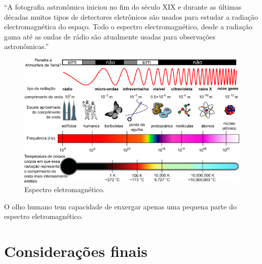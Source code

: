 \documentclass[
	article,			%
	12pt,				%
	oneside,			%
	a4paper,			%
	english,			%
	brazil,				%
	sumario=tradicional
	]{abntex2}
\begin{document}
``A fotografia astronômica iniciou no fim do século XIX e durante as últimas 
décadas muitos tipos de detectores eletrônicos são usados para estudar a
radiação electromagnética do espaço. Todo o espectro electromagnético, desde a 
radiação gama até as ondas de rádio são atualmente usadas para observações 
astronômicas.'' \cite{fotometria}

\begin{figure}[h]
	\includegraphics[width=\linewidth]{img/espectro.png}
	\caption{Espectro eletromagnético.}
	\label{fig:esel}
	\centering
\end{figure}

O olho humano tem capacidade de enxergar apenas uma pequena parte do espectro
eletromagnético.

% 

\section{Considerações finais}

\lipsum[1]

\begin{citacao}
\lipsum[2]
\end{citacao}

\lipsum[3]
\newpage
\postextual{}


\end{document}
